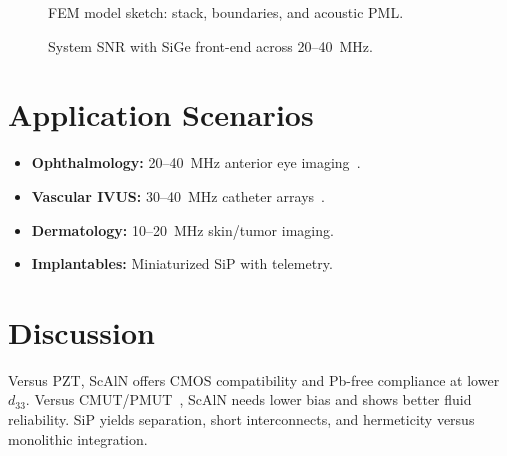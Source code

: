 \documentclass[conference]{IEEEtran}
\begin{document}
\begin{figure}[t]
\centering
{}
\caption{FEM model sketch: stack, boundaries, and acoustic PML.}
\label{fig:mode}
\end{figure}

\begin{figure}[t]
\centering
{}
\caption{System SNR with SiGe front-end across 20--40~MHz.}
\label{fig:snr}
\end{figure}

\section{Application Scenarios}
\begin{itemize}
  \item \textbf{Ophthalmology:} 20--40~MHz anterior eye imaging~\cite{pavlin2009ubm}.
  \item \textbf{Vascular IVUS:} 30--40~MHz catheter arrays~\cite{foster2000ivus}.
  \item \textbf{Dermatology:} 10--20~MHz skin/tumor imaging.
  \item \textbf{Implantables:} Miniaturized SiP with telemetry.
\end{itemize}

\section{Discussion}
Versus PZT, ScAlN offers CMOS compatibility and Pb-free compliance at lower $d_{33}$. Versus CMUT/PMUT~\cite{khuri2009cmut}, ScAlN needs lower bias and shows better fluid reliability. SiP yields separation, short interconnects, and hermeticity versus monolithic integration.
\end{document}
